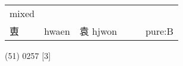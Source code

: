 \documentclass[14pt,a4paper]{scrartcl}
\begin{document}
\begin{longtable}[c]{@{}llllll@{}}
\begin{minipage}[t]{0.14\columnwidth}\raggedright\strut
mixed
\strut\end{minipage}\tabularnewline
\begin{minipage}[t]{0.14\columnwidth}\raggedright\strut
叀
\strut\end{minipage} &
\begin{minipage}[t]{0.14\columnwidth}\raggedright\strut
hwaen
\strut\end{minipage} &
\begin{minipage}[t]{0.14\columnwidth}\raggedright\strut
袁 hjwon
\strut\end{minipage} &
\begin{minipage}[t]{0.14\columnwidth}\raggedright\strut
\strut\end{minipage} &
\begin{minipage}[t]{0.14\columnwidth}\raggedright\strut
\strut\end{minipage} &
\begin{minipage}[t]{0.14\columnwidth}\raggedright\strut
pure:B
\strut\end{minipage}\tabularnewline
\bottomrule
\end{longtable}

(51) 0257 {[}3{]}
\end{document}

